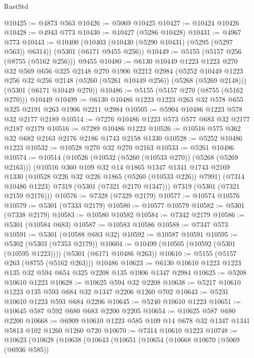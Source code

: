 \begin{lexlean}{RustStd}
\begin{coremodule}
@10425 := @4873 @563
@10426 := @5069 @10425
@10427 := @10424 @10426
@10428 := @4943 @773
@10430 := @10427 (@5286 @10428)
@10431 := @4967 @773
@10443 := @10400
    (@10403 (@10430 (@5290 @10431) (@5295 (@5297 @563)) @6314))
    (@5301 (@6171 @9455 @256))
@10449 := @5155 (@5157 @256 (@8755 (@5162 @256))) @9455
@10480 := @6130
    @10449
    @1223
    @1223
    @270
    @32
    @569
    @656
    @325
    @2148
    @270
    @1906
    @2212
    @2984
    (@5252 @10449 @1223 @256 @32 @256 @2148 (@5260 (@5261 @10449 @256)) (@5268 (@5269 @2148)))
    (@5301 (@6171 @10449 @270))
@10486 := @5155 (@5157 @270 (@8755 (@5162 @270))) @10449
@10499 := @6130 @10486 @1223 @1223 @263 @32 @578 @655 @325 @2191 @263 @1906 @2211 @2984
@10505 := @5904 @10486 @1223 @578 @32 @2177 @2189
@10514 := @7276 @10486 @1223 @573 @577 @683 @32 @2177 @2187 @2179
@10516 := @7289 @10486 @1223
@10526 := @10516 @575 @362 @32 @682 @2163 @2176 @2186 @1743 @2158 @1330
@10528 := @5252 @10486 @1223
@10532 := @10528 @270 @32 @270 @2163
@10533 := @5261 @10486
@10574 := @10514
    (@10526
      (@10532 (@5260 (@10533 @270)) (@5268 (@5269 @2163)))
      (@10516
        @360
        @109
        @32
        @14
        @1865
        @1347
        @1341
        @1743
        @2169
        @1330
        (@10528 @226 @32 @226 @1865 (@5260 (@10533 @226)) @7991)
        (@7314 @10486 @1223)
        @7319
        (@5301 (@7321 @2170 @1347)))
      @7319
      (@5301 (@7321 @2159 @2176)))
@10576 := @7328 (@7329 @2179)
@10577 := @10574 @10576
@10579 := @5301 (@7333 @2179)
@10580 := @10577 @10579
@10582 := @5301 (@7338 @2179)
@10583 := @10580 @10582
@10584 := @7342 @2179
@10586 := @5301 (@10584 @683)
@10587 := @10583 @10586
@10588 := @7347 @573
@10591 := @5301 (@10588 @683 @32)
@10592 := @10587 @10591
@10595 := @5302 (@5303 (@7353 @2179))
@10604 := @10499 (@10505 (@10592 (@5301 (@10595 @1223)))) (@5301 (@6171 @10486 @263))
@10610 := @5155 (@5157 @263 (@8755 (@5162 @263))) @10486
@10623 := @6130 @10610 @1223 @1223 @135 @32 @594 @654 @325 @2208 @135 @1906 @1347 @2984
@10625 := @5208 @10610 @1223
@10628 := @10625 @594 @32 @2208
@10638 := @5217 @10610 @1223 @135 @593 @684 @32 @1347 @2206 @1260 @702
@10643 := @5231 @10610 @1223 @593 @684 @2206
@10645 := @5240 @10610 @1223
@10651 := @10645 @587 @592 @680 @683 @2200 @2205
@10654 := @10625 @587 @680 @2200
@10668 := @6909 @10610 @1223 @585 @109 @14 @678 @32 @1347 @1341 @5813 @102 @1260 @1260 @720
@10670 := @7314 @10610 @1223
@10748 := @10623
    (@10628
      (@10638
        (@10643
          (@10651
            (@10654
              (@10668
                @10670
                (@5069 (@6936 @585))

\end{coremodule}
\end{lexlean}
